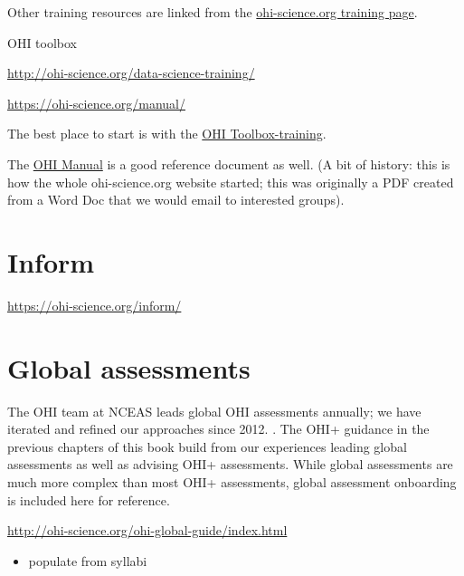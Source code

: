 \documentclass[
]{book}
\providecommand{\tightlist}{%
  \setlength{\itemsep}{0pt}\setlength{\parskip}{0pt}}
\begin{document}
Other training resources are linked from the \href{https://ohi-science.org/training/}{ohi-science.org training page}.

OHI toolbox

\url{http://ohi-science.org/data-science-training/}

\url{https://ohi-science.org/manual/}

The best place to start is with the \href{http://ohi-science.org/toolbox-training/}{OHI Toolbox-training}.

The \href{https://ohi-science.org/manual/}{OHI Manual} is a good reference document as well. (A bit of history: this is how the whole ohi-science.org website started; this was originally a PDF created from a Word Doc that we would email to interested groups).

\hypertarget{inform}{%
\chapter{Inform}\label{inform}}

\url{https://ohi-science.org/inform/}

\hypertarget{global}{%
\chapter{Global assessments}\label{global}}

The OHI team at NCEAS leads global OHI assessments annually; we have iterated and refined our approaches since 2012. . The OHI+ guidance in the previous chapters of this book build from our experiences leading global assessments as well as advising OHI+ assessments. While global assessments are much more complex than most OHI+ assessments, global assessment onboarding is included here for reference.

\url{http://ohi-science.org/ohi-global-guide/index.html}

\begin{itemize}
\tightlist
\item
  populate from syllabi
\end{itemize}

  
\end{document}

